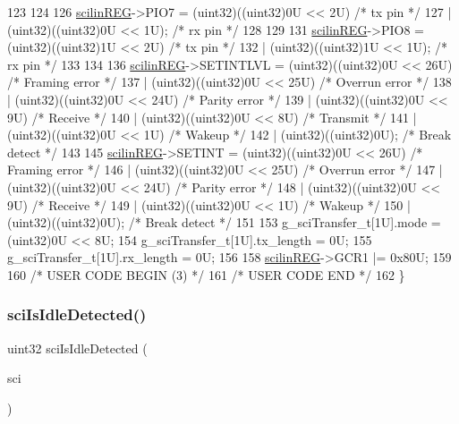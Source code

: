 \begin{DoxyCode}
123 
124 
126     \mbox{\hyperlink{reg__sci_8h_a389eea3394ad09b70e9d400b120186b4}{scilinREG}}->PIO7 = (uint32)((uint32)0U << 2U)  \textcolor{comment}{/* tx pin */}
127                     | (uint32)((uint32)0U << 1U); \textcolor{comment}{/* rx pin */}
128 
129 
131     \mbox{\hyperlink{reg__sci_8h_a389eea3394ad09b70e9d400b120186b4}{scilinREG}}->PIO8 = (uint32)((uint32)1U << 2U)  \textcolor{comment}{/* tx pin */}
132                     | (uint32)((uint32)1U << 1U); \textcolor{comment}{/* rx pin */}
133 
134 
136     \mbox{\hyperlink{reg__sci_8h_a389eea3394ad09b70e9d400b120186b4}{scilinREG}}->SETINTLVL = (uint32)((uint32)0U << 26U)  \textcolor{comment}{/* Framing error */}
137                          | (uint32)((uint32)0U << 25U)  \textcolor{comment}{/* Overrun error */}
138                          | (uint32)((uint32)0U << 24U)  \textcolor{comment}{/* Parity error */}
139                          | (uint32)((uint32)0U << 9U)  \textcolor{comment}{/* Receive */}
140                          | (uint32)((uint32)0U << 8U)  \textcolor{comment}{/* Transmit */}
141                          | (uint32)((uint32)0U << 1U)  \textcolor{comment}{/* Wakeup */}
142                          | (uint32)((uint32)0U);  \textcolor{comment}{/* Break detect */}
143 
145     \mbox{\hyperlink{reg__sci_8h_a389eea3394ad09b70e9d400b120186b4}{scilinREG}}->SETINT = (uint32)((uint32)0U << 26U)  \textcolor{comment}{/* Framing error */}
146                       | (uint32)((uint32)0U << 25U)  \textcolor{comment}{/* Overrun error */}
147                       | (uint32)((uint32)0U << 24U)  \textcolor{comment}{/* Parity error */}
148                       | (uint32)((uint32)0U << 9U)  \textcolor{comment}{/* Receive */}
149                       | (uint32)((uint32)0U << 1U)  \textcolor{comment}{/* Wakeup */}
150                       | (uint32)((uint32)0U);  \textcolor{comment}{/* Break detect */}
151 
153     g\_sciTransfer\_t[1U].mode   = (uint32)0U << 8U;
154     g\_sciTransfer\_t[1U].tx\_length = 0U;
155     g\_sciTransfer\_t[1U].rx\_length = 0U;
156 
158     \mbox{\hyperlink{reg__sci_8h_a389eea3394ad09b70e9d400b120186b4}{scilinREG}}->GCR1 |= 0x80U;
159 
160 \textcolor{comment}{/* USER CODE BEGIN (3) */}
161 \textcolor{comment}{/* USER CODE END */}
162 \}
\end{DoxyCode}
\mbox{\label{group__SCI_gabb100a9163984ca6c9a69133b8eba657}} 
\subsubsection{\texorpdfstring{sci\+Is\+Idle\+Detected()}{sciIsIdleDetected()}}
{\footnotesize\ttfamily uint32 sci\+Is\+Idle\+Detected (\begin{DoxyParamCaption}\item[{\mbox{\hyperlink{reg__sci_8h_ad5e2af74efb062728408d4ac1b7735db}{sci\+B\+A\+S\+E\+\_\+t}} $\ast$}]{sci }\end{DoxyParamCaption})}



